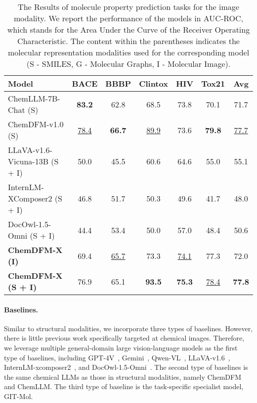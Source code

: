 \begin{table*}
    \centering
    \begin{tabular}{lcccccc}
    \toprule
    Model & BACE & BBBP & Clintox & HIV & Tox21 & Avg \\
    \midrule
    ChemLLM-7B-Chat (S)~\cite{zhang2024chemllm} & \textbf{83.2} & 62.8 & 68.5 & 73.8 & 70.1 & 71.7 \\
    ChemDFM-v1.0 (S)~\cite{zhao2024chemdfm} & \underline{78.4} & \textbf{66.7} & \underline{89.9} & 73.6 & \textbf{79.8} & \underline{77.7} \\
    LLaVA-v1.6-Vicuna-13B (S + I)~\cite{llava} & 50.0 & 45.5 & 60.6 & 64.6 & 55.0 & 55.1\\
    InternLM-XComposer2 (S + I)~\cite{internlmxcomposer} & 46.8 & 51.7 & 50.3 & 49.6 & 41.7 & 48.0 \\
    DocOwl-1.5-Omni (S + I)~\cite{hu2024mplug}  & 44.4 & 53.4 & 50.0 & 57.0 & 48.4 & 50.6 \\
    \multirow{1}{*}{\textbf{ChemDFM-X (I)}} & 69.4 & \underline{65.7} & 73.3 & \underline{74.1} & 77.3 & 72.0 \\
    \multirow{1}{*}{\textbf{ChemDFM-X (S + I)}} & 76.9 & 65.1 & \textbf{93.5} & \textbf{75.3} & \underline{78.4} & \textbf{77.8} \\
    \bottomrule
    \end{tabular}
    \caption{The Results of molecule property prediction tasks for the image modality. We report the performance of the models in AUC-ROC, which stands for the Area Under the Curve of the Receiver Operating Characteristic. The content within the parentheses indicates the molecular representation modalities used for the corresponding model (S - SMILES, G - Molecular Graphs, I - Molecular Image).}
    \label{tab:image-molnet}
\end{table*}

\paragraph{Baselines.} Similar to structural modalities, we incorporate three types of baselines.
However, there is little previous work specifically targeted at chemical images. Therefore, we leverage multiple general-domain large vision-language models as the first type of baselines, including GPT-4V~\cite{gpt-4v}, Gemini~\cite{gemini}, Qwen-VL~\cite{qwenvl}, LLaVA-v1.6~\cite{llava}, InternLM-xcomposer2~\cite{internlmxcomposer}, and DocOwl-1.5-Omni~\cite{hu2024mplug}. The second type of baselines is the same chemical LLMs as those in structural modalities, namely ChemDFM and ChemLLM. 
The third type of baseline is the task-specific specialist model, GIT-Mol.

